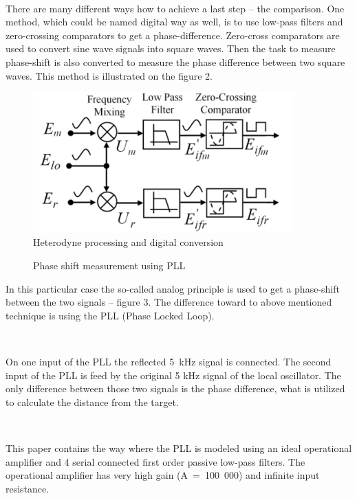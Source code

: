 \documentclass[fleqn]{article}
\begin{document}
~

There are many different ways how to achieve a last step – the comparison. One method, which could be named digital way as well, is to use low-pass filters and zero-crossing comparators to get a phase-difference. Zero-cross comparators are used to convert sine wave signals into square waves. Then the task to measure phase-shift is also converted to measure the phase difference between two square waves. This method is illustrated on the figure 2.

\begin{figure}[h]
    \begin{center}
        \includegraphics[width=10cm]{fin.png}
    \end{center}
    \caption{Heterodyne processing and digital conversion}
\end{figure}

\begin{figure}[h]
    \begin{center}
    \end{center}
    \caption{Phase shift measurement using PLL}
\end{figure}

In this particular case the so-called analog principle is used to get a phase-shift between the two signals – figure 3. The difference toward to above mentioned technique is using the PLL (Phase Locked Loop).

~

On one input of the PLL the reflected 5 kHz signal is connected. The second input of the PLL is feed by the original 5 kHz signal of the local oscillator. The only difference between those two signals is the phase difference, what is utilized to calculate the distance from the target.

~

This paper contains the way where the PLL is modeled using an ideal operational amplifier and 4 serial connected first order passive low-pass filters. The operational amplifier has very high gain (A = 100 000) and infinite input resistance.
\end{document}
